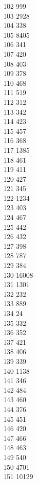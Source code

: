 { 102	999 \\
 103	2928 \\
 104	338 \\
 105	8405 \\
 106	341 \\
 107	420 \\
 108	403 \\
 109	378 \\
 110	468 \\
 111	519 \\
 112	312 \\
 113	342 \\
 114	423 \\
 115	457 \\
 116	368 \\
 117	1385 \\
 118	461 \\
 119	411 \\
 120	427 \\
 121	345 \\
 122	1234 \\
 123	403 \\
 124	467 \\
 125	442 \\
 126	432 \\
 127	398 \\
 128	787 \\
 129	384 \\
 130	16008 \\
 131	1301 \\
 132	232 \\
 133	889 \\
 134	24 \\
 135	332 \\
 136	352 \\
 137	421 \\
 138	406 \\
 139	339 \\
 140	1138 \\
 141	346 \\
 142	484 \\
 143	460 \\
 144	376 \\
 145	451 \\
 146	420 \\
 147	466 \\
 148	463 \\
 149	540 \\
 150	4701 \\
 151	10129 \\
}
